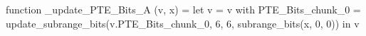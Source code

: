 function _update_PTE_Bits_A (v, x) = let v = { v with PTE_Bits_chunk_0 = update_subrange_bits(v.PTE_Bits_chunk_0, 6, 6, subrange_bits(x, 0, 0)) } in
  v
